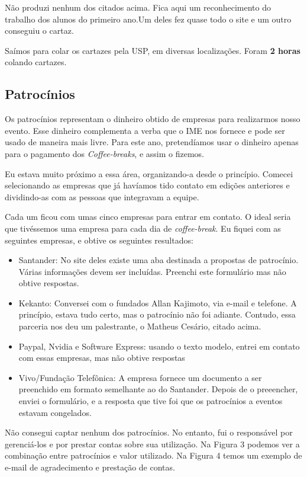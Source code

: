 \documentclass[12pt,letterpaper]{article}
\begin{document}
	Não produzi nenhum dos citados acima. Fica aqui um reconhecimento do trabalho dos alunos do primeiro ano.Um deles fez quase todo o site e um outro conseguiu o cartaz. 
	
	Saímos para colar os cartazes pela USP, em diversas localizações\cite{cartazes}. Foram \textbf{2 horas} colando cartazes. 
	
	\subsection{Patrocínios}
	
	Os patrocínios representam o dinheiro obtido de empresas para realizarmos nosso evento. Esse dinheiro complementa a verba que o IME nos fornece e pode ser usado de maneira mais livre. Para este ano, pretendíamos usar o dinheiro apenas para o pagamento dos \textit{Coffee-breaks}, e assim o fizemos. 
	
	Eu estava muito próximo a essa área, organizando-a desde o princípio. Comecei selecionando as empresas que já havíamos tido contato em edições anteriores e dividindo-as com as pessoas que integravam a equipe. 
	
	Cada um ficou com umas cinco empresas para entrar em contato. O ideal seria que tivéssemos uma empresa para cada dia de \textit{coffee-break}. Eu fiquei com as seguintes empresas, e obtive os seguintes resultados:
	
	\begin{itemize}
		\item Santander: No site deles existe uma aba destinada a propostas de patrocínio. Várias informações devem ser incluídas. Preenchi este formulário mas não obtive respostas.
		\item Kekanto: Conversei com o fundados Allan Kajimoto, via e-mail e telefone. A princípio, estava tudo certo, mas o patrocínio não foi adiante. Contudo, essa parceria nos deu um palestrante, o Matheus Cesário, citado acima.
		\item Paypal, Nvidia e Software Express: usando o texto modelo\cite{modelo_pat}, entrei em contato com essas empresas, mas não obtive respostas
		\item Vivo/Fundação Telefônica: A empresa fornece um documento a ser preenchido em formato semelhante ao do Santander. Depois de o preeencher, enviei o formulário, e a resposta que tive foi que os patrocínios a eventos estavam congelados.
	\end{itemize}
	
	Não consegui captar nenhum dos patrocínios. No entanto, fui o responsável por gerenciá-los e por prestar contas sobre sua utilização.
	Na Figura 3 podemos ver a combinação entre patrocínios e valor utilizado. Na Figura 4 temos um exemplo de e-mail de agradecimento e prestação de contas.
	
\end{document}
